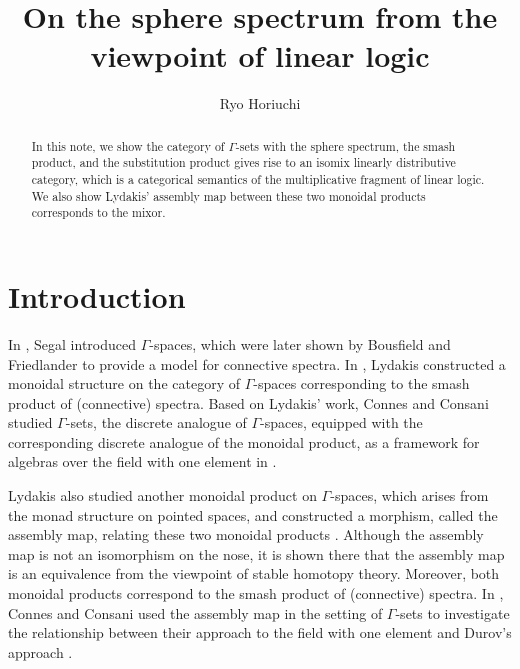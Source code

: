 \documentclass{article}
\numberwithin{equation}{section}
\theoremstyle{definition}
\begin{document}
\title{On the sphere spectrum from the viewpoint of linear logic}
\author{Ryo Horiuchi}
\date{}

\maketitle

\begin{abstract}
In this note, we show the category of $\Gamma$-sets with the sphere spectrum, the smash product, and the substitution product gives rise to an isomix linearly distributive category, which is a categorical semantics of the multiplicative fragment of linear logic.
We also show Lydakis' assembly map between these two monoidal products corresponds to the mixor.




\end{abstract} 






























\section{Introduction}
In \cite{Segal}, Segal introduced $\Gamma$-spaces, which were later shown by Bousfield and Friedlander \cite{BF} to provide a model for connective spectra.
In \cite{Lydakis}, Lydakis constructed a monoidal structure on the category of $\Gamma$-spaces corresponding to the smash product of (connective) spectra.
Based on Lydakis' work, Connes and Consani studied $\Gamma$-sets, the discrete analogue of $\Gamma$-spaces, equipped with the corresponding discrete analogue of the monoidal product, as a framework for algebras over the field with one element in \cite{CC}.


Lydakis also studied another monoidal product on $\Gamma$-spaces, which arises from the monad structure on pointed spaces, and constructed a morphism, called the assembly map, relating these two monoidal products \cite{Lydakis}.
Although the assembly map is not an isomorphism on the nose, it is shown there that the assembly map is an equivalence from the viewpoint of stable homotopy theory.
Moreover, both monoidal products correspond to the smash product of (connective) spectra.
In \cite{CC}, Connes and Consani used the assembly map in the setting of $\Gamma$-sets to investigate the relationship between their approach to the field with one element and Durov's approach \cite{Durov}.
\end{document}
